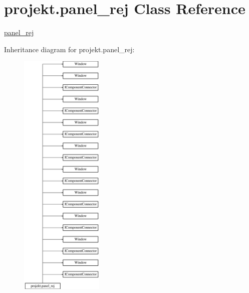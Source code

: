 \hypertarget{classprojekt_1_1panel__rej}{}\section{projekt.\+panel\+\_\+rej Class Reference}
\label{classprojekt_1_1panel__rej}


\mbox{\hyperlink{classprojekt_1_1panel__rej}{panel\+\_\+rej}}  


Inheritance diagram for projekt.\+panel\+\_\+rej\+:\begin{figure}[H]
\begin{center}
\leavevmode
\includegraphics[height=12.000000cm]{classprojekt_1_1panel__rej}
\end{center}
\end{figure}
